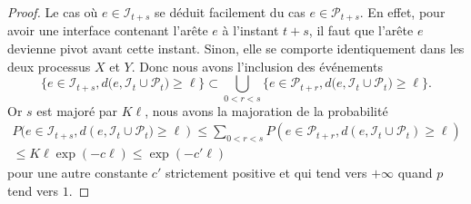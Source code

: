 \documentclass[titlepage,a4paper,12pt]{article}
\newcounter{th}
\begin{document}
\begin{proof}
Le cas où $e\in \mathcal{I}_{t+s}$ se déduit facilement du cas $e\in \mathcal{P}_{t+s}$. En effet, pour avoir une interface contenant l'arête $e$ à l'instant $t+s$, il faut que l'arête $e$ devienne pivot avant cette instant. Sinon, elle se comporte identiquement dans les deux processus $X$ et $Y$. Donc nous avons l'inclusion des événements 
$$ \big\{ e\in \mathcal{I}_{t+s}, d(e,\mathcal{I}_t \cup \mathcal{P}_{t}\big) \geqslant \ell\} \subset \bigcup_{0<r<s}\big\{ e\in \mathcal{P}_{t+r}, d(e,\mathcal{I}_t \cup \mathcal{P}_{t}\big) \geqslant \ell\}.
$$
Or $s$ est majoré par $K\ell$, nous avons la majoration de la probabilité
\begin{multline*} P(e\in \mathcal{I}_{t+s}, d(e,\mathcal{I}_t \cup \mathcal{P}_{t}\big) \geqslant \ell) \leqslant \sum_{0<r<s} P(e\in \mathcal{P}_{t+r}, d(e,\mathcal{I}_t \cup \mathcal{P}_{t})\geqslant \ell) \\ \leqslant K\ell\exp(-c\ell)\leqslant \exp(-c'\ell)
\end{multline*}
pour une autre constante $c'$ strictement positive et qui tend vers $+\infty$ quand $p$ tend vers $1$. 
\end{proof}
\end{document}
